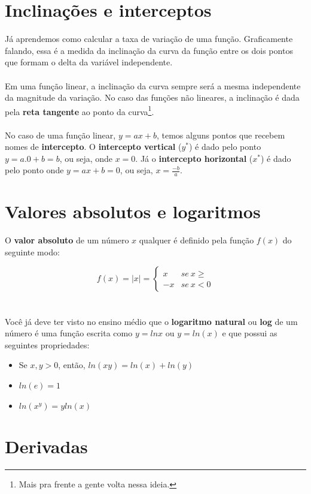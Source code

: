 \documentclass[a4paper,11pt,oneside]{book}
\theoremstyle{definition}
\theoremstyle{break}
\begin{document}
\section{Inclinações e interceptos}

Já aprendemos como calcular a taxa de variação de uma função. Graficamente falando, essa é a medida da inclinação da curva da função entre os dois pontos que formam o delta da variável independente. 
\\
\\
Em uma função linear, a inclinação da curva sempre será a mesma independente da magnitude da variação. No caso das funções não lineares, a inclinação é dada pela \textbf{reta tangente} ao ponto da curva\footnote{Mais pra frente a gente volta nessa ideia.}.
\\
\\
No caso de uma função linear, $ y = ax + b$, temos alguns pontos que recebem nomes de \textbf{intercepto}. O \textbf{intercepto vertical} ($y^*$) é dado pelo ponto $y = a.0 + b = b$, ou seja, onde $x = 0$. Já o \textbf{intercepto horizontal} ($x^*$) é dado pelo ponto onde $y = ax + b = 0 $, ou seja, $ x = \frac{-b}{a}$.

\section{Valores absolutos e logaritmos}

O \textbf{valor absoluto} de um número $x$ qualquer é definido pela função $f(x)$ do seguinte modo:

\[ f(x) = |x| = \begin{cases} x & se \ x \geqslant \\ -x & se \ x < 0 \end{cases} \]
\\
\\
Você já deve ter visto no ensino médio que o \textbf{logaritmo natural} ou \textbf{log} de um número é uma função escrita como $y = lnx$ ou $y = ln(x)$ e que possui as seguintes propriedades:

\begin{itemize}
 \item Se $x,y > 0$, então, $ ln(xy) = ln(x) + ln(y) $
 \item $ ln(e) = 1 $
 \item $ ln(x^y) = y ln(x) $
\end{itemize}

\section{Derivadas}
\end{document}
